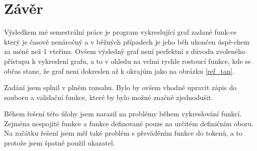\documentclass[../main.tex]{subfiles}
\begin{document}
\section{Závěr}
Výsledkem mé semestrální práce je program vykreslující graf zadané funk-ce který je časově nenáročný a v běžných případech je jeho běh ukončen úspě-chem za méně než 1 vteřinu. Ovšem výsledný graf není perfektní z důvodu zvoleného přístupu k vykreslení grafu, a to v ohledu na velmi rychle rostoucí funkce, kde se občas stane, že graf není dokreslen až k okrajům jako na obrázku \ref{ref_tan}.
\vspace{0.5em}

Zadání jsem splnil v plném rozsahu. Bylo by ovšem vhodné upravit zápis do souboru a validační funkce, které by bylo možné značně zjednodušit.
\vspace{0.5em}

Během řešení této úlohy jsem narazil na problémy během vykreslování funkcí. Zejména nespojité funkce a funkce definované pouze na určitém definičním oboru. Na začátku řešení jsem měl také problém s převáděním funkce do tokenů, a to protože jsem špatně použil ukazatel.
\end{document}
